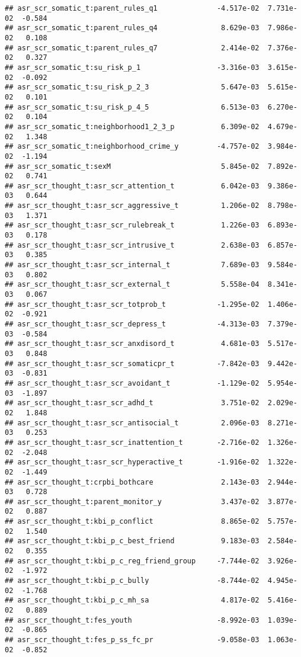 \documentclass[
]{article}
\begin{document}
\begin{verbatim}
## asr_scr_somatic_t:parent_rules_q1              -4.517e-02  7.731e-02  -0.584
## asr_scr_somatic_t:parent_rules_q4               8.629e-03  7.986e-02   0.108
## asr_scr_somatic_t:parent_rules_q7               2.414e-02  7.376e-02   0.327
## asr_scr_somatic_t:su_risk_p_1                  -3.316e-03  3.615e-02  -0.092
## asr_scr_somatic_t:su_risk_p_2_3                 5.647e-03  5.615e-02   0.101
## asr_scr_somatic_t:su_risk_p_4_5                 6.513e-03  6.270e-02   0.104
## asr_scr_somatic_t:neighborhood1_2_3_p           6.309e-02  4.679e-02   1.348
## asr_scr_somatic_t:neighborhood_crime_y         -4.757e-02  3.984e-02  -1.194
## asr_scr_somatic_t:sexM                          5.845e-02  7.892e-02   0.741
## asr_scr_thought_t:asr_scr_attention_t           6.042e-03  9.386e-03   0.644
## asr_scr_thought_t:asr_scr_aggressive_t          1.206e-02  8.798e-03   1.371
## asr_scr_thought_t:asr_scr_rulebreak_t           1.226e-03  6.893e-03   0.178
## asr_scr_thought_t:asr_scr_intrusive_t           2.638e-03  6.857e-03   0.385
## asr_scr_thought_t:asr_scr_internal_t            7.689e-03  9.584e-03   0.802
## asr_scr_thought_t:asr_scr_external_t            5.558e-04  8.341e-03   0.067
## asr_scr_thought_t:asr_scr_totprob_t            -1.295e-02  1.406e-02  -0.921
## asr_scr_thought_t:asr_scr_depress_t            -4.313e-03  7.379e-03  -0.584
## asr_scr_thought_t:asr_scr_anxdisord_t           4.681e-03  5.517e-03   0.848
## asr_scr_thought_t:asr_scr_somaticpr_t          -7.842e-03  9.442e-03  -0.831
## asr_scr_thought_t:asr_scr_avoidant_t           -1.129e-02  5.954e-03  -1.897
## asr_scr_thought_t:asr_scr_adhd_t                3.751e-02  2.029e-02   1.848
## asr_scr_thought_t:asr_scr_antisocial_t          2.096e-03  8.271e-03   0.253
## asr_scr_thought_t:asr_scr_inattention_t        -2.716e-02  1.326e-02  -2.048
## asr_scr_thought_t:asr_scr_hyperactive_t        -1.916e-02  1.322e-02  -1.449
## asr_scr_thought_t:crpbi_bothcare                2.143e-03  2.944e-03   0.728
## asr_scr_thought_t:parent_monitor_y              3.437e-02  3.877e-02   0.887
## asr_scr_thought_t:kbi_p_conflict                8.865e-02  5.757e-02   1.540
## asr_scr_thought_t:kbi_p_c_best_friend           9.183e-03  2.584e-02   0.355
## asr_scr_thought_t:kbi_p_c_reg_friend_group     -7.744e-02  3.926e-02  -1.972
## asr_scr_thought_t:kbi_p_c_bully                -8.744e-02  4.945e-02  -1.768
## asr_scr_thought_t:kbi_p_c_mh_sa                 4.817e-02  5.416e-02   0.889
## asr_scr_thought_t:fes_youth                    -8.992e-03  1.039e-02  -0.865
## asr_scr_thought_t:fes_p_ss_fc_pr               -9.058e-03  1.063e-02  -0.852

\end{verbatim}
\end{document}

